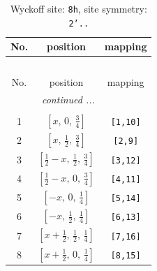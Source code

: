 \documentclass[fleqn,8pt]{jsarticle}
\begin{document}
\begin{longtable}{ccc}
\caption{Wyckoff site: {\tt 8h}, site symmetry: {\tt 2'..}}
 \\
 \hline \hline
No. & position & mapping \\ \hline \endfirsthead

\multicolumn{2}{l}{\tablename\ \thetable{}} \\
 \hline \hline
No. & position & mapping \\ \hline \endhead

 \hline \hline
\multicolumn{2}{r}{\footnotesize\it continued ...} \\ \endfoot

 \hline \hline
\multicolumn{2}{r}{} \\ \endlastfoot

1 & $\left[ x,\, 0,\, \frac{3}{4} \right]$ & {\tt [1,10]} \\ \hline
2 & $\left[ x,\, \frac{1}{2},\, \frac{3}{4} \right]$ & {\tt [2,9]} \\ \hline
3 & $\left[ \frac{1}{2} - x,\, \frac{1}{2},\, \frac{3}{4} \right]$ & {\tt [3,12]} \\ \hline
4 & $\left[ \frac{1}{2} - x,\, 0,\, \frac{3}{4} \right]$ & {\tt [4,11]} \\ \hline
5 & $\left[ - x,\, 0,\, \frac{1}{4} \right]$ & {\tt [5,14]} \\ \hline
6 & $\left[ - x,\, \frac{1}{2},\, \frac{1}{4} \right]$ & {\tt [6,13]} \\ \hline
7 & $\left[ x + \frac{1}{2},\, \frac{1}{2},\, \frac{1}{4} \right]$ & {\tt [7,16]} \\ \hline
8 & $\left[ x + \frac{1}{2},\, 0,\, \frac{1}{4} \right]$ & {\tt [8,15]} \\
\end{longtable}
\renewcommand{\arraystretch}{1.2}
\end{document}
